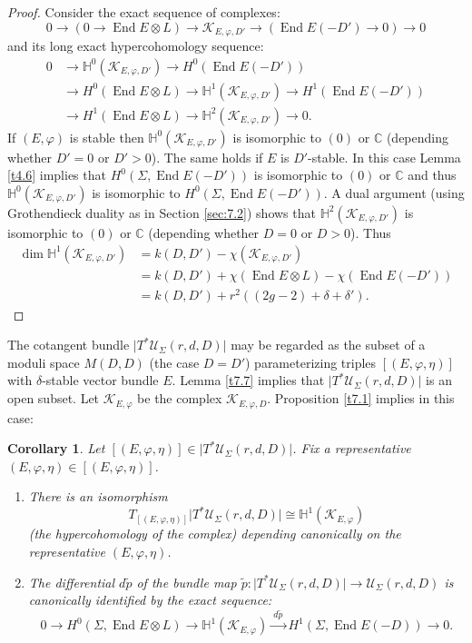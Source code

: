 \documentclass[12pt,a4paper,oneside,english]{smfart}
\newtheorem{cor}[thm]{Corollary}
\theoremstyle{definition}
\theoremstyle{remark}
\DeclareMathOperator{\End}{End}
\newcommand{\cU}{\mathcal{U}}
\newcommand{\KK}{\mathscr{K}}
\newcommand{\HH}{\mathbb{H}}
\newcommand{\tot}[1]{\lvert #1 \rvert}
\begin{document}
\begin{proof}
Consider the exact sequence of complexes:
\[
0 \to (0 \to \End E \otimes L) \to \KK_{E, \varphi, D'} \to (\End E(-D') \to 0) \to 0
\]
and its long exact hypercohomology sequence:
\begin{align*}
0 &\to \HH^0(\KK_{E, \varphi, D'}) \to H^0(\End E(-D')) \\
&\to H^0(\End E \otimes L) \to \HH^1(\KK_{E, \varphi, D'}) \to H^1(\End E(-D')) \\
&\to H^1(\End E \otimes L) \to \HH^2(\KK_{E, \varphi, D'}) \to 0.
\end{align*}
If $(E, \varphi)$ is stable then $\HH^0(\KK_{E, \varphi, D'})$ is isomorphic to $(0)$ or $\mathbb{C}$ (depending whether $D' = 0$ or $D' > 0$). The same holds if $E$ is $D'$-stable. In this case Lemma \ref{t4.6} implies that $H^0(\Sigma, \End E(-D'))$ is isomorphic to $(0)$ or $\mathbb{C}$ and thus $\HH^0(\KK_{E, \varphi, D'})$ is isomorphic to $H^0(\Sigma, \End E(-D'))$. A dual argument (using Grothendieck duality as in Section \ref{sec:7.2}) shows that $\HH^2(\KK_{E, \varphi, D'})$ is isomorphic to $(0)$ or $\mathbb{C}$ (depending whether $D = 0$ or $D > 0$). Thus
\begin{align*}
\dim \HH^1(\KK_{E, \varphi, D'}) &= k(D, D') - \chi(\KK_{E, \varphi, D'}) \\
&= k(D, D') + \chi(\End E \otimes L) - \chi(\End E(-D')) \\
&= k(D, D') + r^2((2g - 2) + \delta + \delta').
\end{align*}
\end{proof}

The cotangent bundle $\tot{T^*\cU_\Sigma(r, d, D)}$ may be regarded as the subset of a moduli space $M(D, D)$ (the case $D = D'$) parameterizing triples $[(E, \varphi, \eta)]$ with $\delta$-stable vector bundle $E$. Lemma \ref{t7.7} implies that $\tot{T^*\cU_\Sigma(r, d, D)}$ is an open subset. Let $\KK_{E, \varphi}$ be the complex $\KK_{E, \varphi, D}$. Proposition \ref{t7.1} implies in this case:

\begin{cor}\label{t7.8}
Let $[(E, \varphi, \eta)] \in \tot{T^*\cU_\Sigma(r, d, D)}$. Fix a representative $(E, \varphi, \eta) \in [(E, \varphi, \eta)]$.
\begin{enumerate}
    \item There is an isomorphism
    \[
    T_{[(E, \varphi, \eta)]}\tot{T^*\cU_\Sigma(r, d, D)} \cong \HH^1(\KK_{E, \varphi})
    \]
    (the hypercohomology of the complex) depending canonically on the representative $(E, \varphi, \eta)$.
    \item The differential $d\tilde{p}$ of the bundle map $\tilde{p} \colon \tot{T^*\cU_\Sigma(r, d, D)} \to \cU_\Sigma(r, d, D)$ is canonically identified by the exact sequence:
    \[
    0 \to H^0(\Sigma, \End E \otimes L) \to \HH^1(\KK_{E, \varphi}) \xrightarrow{\ d\tilde{p}\ } H^1(\Sigma, \End E(-D)) \to 0.
    \]
\end{enumerate}
\end{cor}
\end{document}

